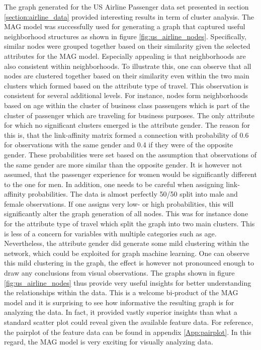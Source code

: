   The graph generated for the US Airline Passenger data set presented in section
  \ref{section:airline_data} provided interesting results in term of cluster
  analysis. The MAG model was successfully used for generating a graph that
  captured useful neighborhood structures as shown in figure
  \ref{fig:us_airline_nodes}. Specifically, similar nodes were grouped together 
  based on their similarity given the selected attributes for the MAG model. 
  Especially appealing is that neighborhoods are also consistent within 
  neighborhoods. To illustrate this, one can observe that all nodes are
  clustered together based on their similarity even within the two main
  clusters which formed based on the attribute type of travel. This
  observation is consistent for several additional levels. For instance, nodes
  form neighborhoods based on age within the cluster of business class
  passengers which is part of the cluster of passenger which are traveling for
  business purposes. The only attribute for which no significant clusters
  emerged is the attribute gender. The reason for this is, that the
  link-affinity matrix formed a connection with probability of 0.6 for
  observations with the same gender and 0.4 if they were of the opposite
  gender. These probabilities were set based on the assumption that
  observations of the same gender are more similar than the opposite gender. It
  is however not assumed, that the passenger experience for women would be
  significantly different to the one for men. In addition, one needs to be
  careful when assigning link-affinity probabilities. The data is almost
  perfectly 50/50 split into male and female observations. If one assigns very
  low- or high probabilities, this will significantly alter the graph
  generation of all nodes. This was for instance done for the attribute type of 
  travel which split the graph into two main clusters. This is less of a concern 
  for variables with multiple categories such as age. Nevertheless, the
  attribute gender did generate some mild clustering within the network, which 
  could be exploited for graph machine learning. One can observe this mild
  clustering in the graph, the effect is however not pronounced enough to draw
  any conclusions from visual observations. The graphs shown in figure
  \ref{fig:us_airline_nodes} thus provide very useful insights for better
  understanding the relationships within the data. This is a welcome bi-product
  of the MAG model and it is surprising to see how informative the resulting 
  graph is for analyzing the data. In fact, it provided vastly superior 
  insights than what a standard scatter plot could reveal given the available 
  feature data. For reference, the pairplot of the feature data can be found in 
  appendix \ref{App:pairplot}. In this regard, the MAG model is very exciting for visually
  analyzing data. \\

